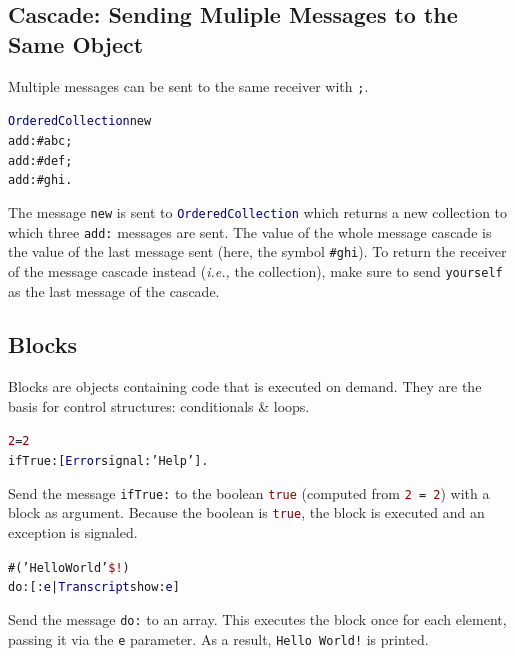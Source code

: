 \documentclass[notumble]{leaflet}
\makeatletter
\newcommand{\ie}{\emph{i.e.,}\xspace}
\newenvironment{displaycode}{%
     \par
     \hspace{1.5em}\begin{minipage}{\linewidth}
       \begin{alltt}\small}{
       \end{alltt}
     \end{minipage}
     \par}
\newcommand{\code}[1]{\foreignlanguage{english}{\texttt{#1}}}
\makeatother
\begin{document}
\subsection{Cascade: Sending Muliple Messages to the Same Object}

Multiple messages can be sent to the same receiver with \code{;}.

\begin{displaycode}
\textcolor{darkBlue}{OrderedCollection} new
  add: \textcolor{string}{#abc};
  add: \textcolor{string}{#def};
  add: \textcolor{string}{#ghi}.
\end{displaycode}

The message \code{new} is sent to \code{\textcolor{darkBlue}{OrderedCollection}} which
returns a new collection to which three
\code{add:} messages are sent. The value of the whole message cascade
is the value of the last message sent (here, the symbol
\textcolor{string}{\code{\#ghi}}). To return the receiver of the
message cascade instead (\ie the collection), make sure to send
\code{yourself} as the last message of the cascade.

\vspace{-0.3cm}
\subsection{Blocks}
Blocks are objects containing code that is executed on demand. They are the basis for control structures:
conditionals \& loops.

\begin{displaycode}
\textcolor{darkRed}{2} = \textcolor{darkRed}{2}
  ifTrue: [ \textcolor{darkBlue}{Error} signal: \textcolor{string}{'Help'} ].
\end{displaycode}
Send the message \code{ifTrue:} to the boolean
\textcolor{darkRed}{\code{true}} (computed from
\code{\textcolor{darkRed}{2} = \textcolor{darkRed}{2}}) with a block
as argument. Because the boolean is \textcolor{darkRed}{\code{true}},
the block is executed and an exception is signaled.

\begin{displaycode}
\#(\textcolor{string}{'Hello World'} \textcolor{darkRed}{\$!})
  do: [ :\textcolor{darkBlue}{e} | \textcolor{darkBlue}{Transcript} show: \textcolor{darkBlue}{e} ]
\end{displaycode}

Send the message \code{do:} to an array. This executes the block
once for each element, passing it via the \code{e} parameter. As a
result, \code{\textcolor{string}{Hello~World!}} is printed.
\end{document}
